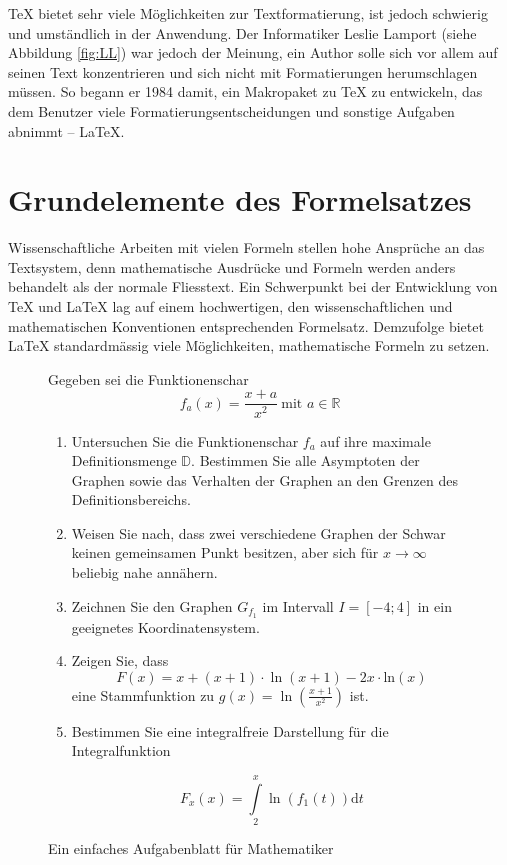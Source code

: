\documentclass[11pt, a4paper,draft]{article}
\newcommand{\ltx}{\LaTeX}
\begin{document}
\TeX{} bietet sehr viele Möglichkeiten zur Textformatierung, ist jedoch schwierig und umständlich in der Anwendung. Der Informatiker Leslie Lamport (siehe Abbildung \ref{fig:LL}) war jedoch der Meinung, ein Author solle sich vor allem auf seinen Text konzentrieren und sich nicht mit Formatierungen herumschlagen müssen. So begann er 1984 damit, ein Makropaket zu \TeX{} zu entwickeln, das dem Benutzer viele Formatierungsentscheidungen und sonstige Aufgaben abnimmt -- \ltx{}.

\section{Grundelemente des Formelsatzes}

Wissenschaftliche Arbeiten mit vielen Formeln stellen hohe Ansprüche an das Textsystem, denn mathematische Ausdrücke und Formeln werden anders behandelt als der normale Fliesstext. Ein Schwerpunkt bei der Entwicklung von \TeX{} und \ltx{} lag auf einem hochwertigen, den wissenschaftlichen und mathematischen Konventionen entsprechenden Formelsatz. Demzufolge bietet \ltx{} standardmässig viele Möglichkeiten, mathematische Formeln zu setzen.

\begingroup
{}
\begin{figure}[p!] %
Gegeben sei die Funktionenschar
\begin{displaymath}
f_a(x) = \frac{x+a}{x^2}~\mbox{mit } a \in \mathbb{R}
\end{displaymath}
\begin{enumerate}
\item Untersuchen Sie die Funktionenschar \( f_a\) auf ihre maximale Definitionsmenge \(\mathbb{D}\). Bestimmen Sie alle Asymptoten der Graphen sowie das Verhalten der Graphen an den Grenzen des Definitionsbereichs.
\item Weisen Sie nach, dass zwei verschiedene Graphen der Schwar keinen gemeinsamen Punkt besitzen, aber sich für \(x\to\infty\) beliebig nahe annähern.
\item Zeichnen Sie den Graphen \(G_{f_1}\) im Intervall \(I = \left[-4;4\right]\) in ein geeignetes Koordinatensystem.
\item Zeigen Sie, dass
\begin{displaymath}
F(x) = x +(x+1)\cdot\ln(x+1) - 2x\cdot\mbox{ln}(x)
\end{displaymath}
eine Stammfunktion zu \(\displaystyle g(x) = \ln\left(\frac{x+1}{x^2}\right)\) ist.
\item Bestimmen Sie eine integralfreie Darstellung für die Integralfunktion

\[ F_x(x) = \int\limits_2^x\ln(f_1(t))\mathrm{d}t \]
\end{enumerate}
\caption{Ein einfaches Aufgabenblatt für Mathematiker}
\label{fig:formeln}
\end{figure}
\endgroup
\end{document}
